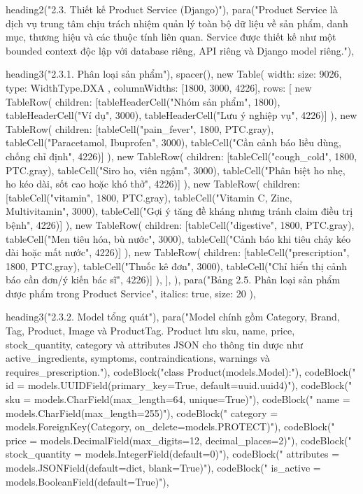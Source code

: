   heading2("2.3. Thiết kế Product Service (Django)"),
  para("Product Service là dịch vụ trung tâm chịu trách nhiệm quản lý toàn bộ dữ liệu về sản phẩm, danh mục, thương hiệu và các thuộc tính liên quan. Service được thiết kế như một bounded context độc lập với database riêng, API riêng và Django model riêng."),

  heading3("2.3.1. Phân loại sản phẩm"),
  spacer(),
  new Table({
    width: { size: 9026, type: WidthType.DXA },
    columnWidths: [1800, 3000, 4226],
    rows: [
      new TableRow({ children: [tableHeaderCell("Nhóm sản phẩm", 1800), tableHeaderCell("Ví dụ", 3000), tableHeaderCell("Lưu ý nghiệp vụ", 4226)] }),
      new TableRow({ children: [tableCell("pain_fever", 1800, PTC.gray), tableCell("Paracetamol, Ibuprofen", 3000), tableCell("Cần cảnh báo liều dùng, chống chỉ định", 4226)] }),
      new TableRow({ children: [tableCell("cough_cold", 1800, PTC.gray), tableCell("Siro ho, viên ngậm", 3000), tableCell("Phân biệt ho nhẹ, ho kéo dài, sốt cao hoặc khó thở", 4226)] }),
      new TableRow({ children: [tableCell("vitamin", 1800, PTC.gray), tableCell("Vitamin C, Zinc, Multivitamin", 3000), tableCell("Gợi ý tăng đề kháng nhưng tránh claim điều trị bệnh", 4226)] }),
      new TableRow({ children: [tableCell("digestive", 1800, PTC.gray), tableCell("Men tiêu hóa, bù nước", 3000), tableCell("Cảnh báo khi tiêu chảy kéo dài hoặc mất nước", 4226)] }),
      new TableRow({ children: [tableCell("prescription", 1800, PTC.gray), tableCell("Thuốc kê đơn", 3000), tableCell("Chỉ hiển thị cảnh báo cần đơn/ý kiến bác sĩ", 4226)] }),
    ],
  }),
  para("Bảng 2.5. Phân loại sản phẩm dược phẩm trong Product Service", { italics: true, size: 20 }),

  heading3("2.3.2. Model tổng quát"),
  para("Model chính gồm Category, Brand, Tag, Product, Image và ProductTag. Product lưu sku, name, price, stock_quantity, category và attributes JSON cho thông tin dược như active_ingredients, symptoms, contraindications, warnings và requires_prescription."),
  codeBlock("class Product(models.Model):"),
  codeBlock("    id = models.UUIDField(primary_key=True, default=uuid.uuid4)"),
  codeBlock("    sku = models.CharField(max_length=64, unique=True)"),
  codeBlock("    name = models.CharField(max_length=255)"),
  codeBlock("    category = models.ForeignKey(Category, on_delete=models.PROTECT)"),
  codeBlock("    price = models.DecimalField(max_digits=12, decimal_places=2)"),
  codeBlock("    stock_quantity = models.IntegerField(default=0)"),
  codeBlock("    attributes = models.JSONField(default=dict, blank=True)"),
  codeBlock("    is_active = models.BooleanField(default=True)"),

